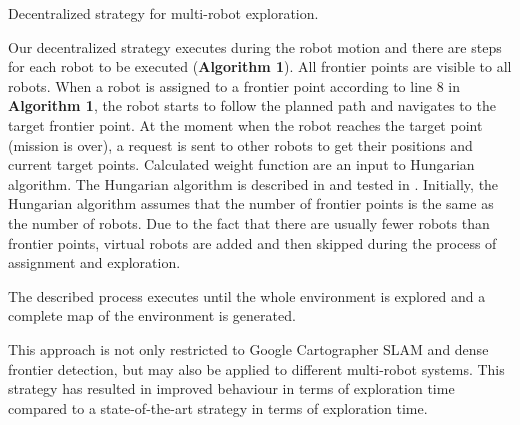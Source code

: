 \begin{algorithm}[b!]
	\label{algorithm1}
	\caption{Decentralized strategy for multi-robot exploration.}
\end{algorithm}


Our decentralized strategy executes during the robot motion and there are steps for each robot to be executed (\textbf{Algorithm 1}). All frontier points are visible to all robots.
When a robot is assigned to a frontier point according to line 8 in \textbf{Algorithm 1}, the robot starts to follow the planned path and navigates to the target frontier point. At the moment when the robot reaches the target point (mission is over), a request is sent to other robots to get their positions and current target points. Calculated weight function are an input to Hungarian algorithm. 
The Hungarian algorithm is described in \cite{Kuhn1955} and tested in \cite{Kulich2015}. Initially, the Hungarian algorithm assumes that the number of frontier points is the same as the number of robots. Due to the fact that there are usually fewer robots than frontier points, virtual robots are added and then skipped during the process of assignment and exploration. 

The described process executes until the whole environment is explored and a complete  map of the environment is generated.

This approach is not only restricted to Google Cartographer SLAM and dense frontier detection, but may also be applied to different multi-robot systems. This strategy has resulted in improved behaviour in terms of exploration time compared to a state-of-the-art strategy in terms of exploration time. 


